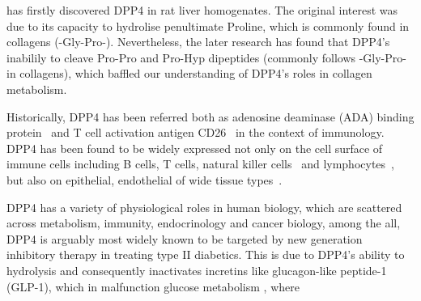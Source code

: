 \citet{Hopsu-Havu1966} has firstly discovered DPP4 in rat liver homogenates. The original interest was due to its capacity to hydrolise penultimate Proline, which is commonly found in collagens (-Gly-Pro-). Nevertheless, the later research has found that DPP4's inabilily to cleave Pro-Pro and Pro-Hyp dipeptides (commonly follows -Gly-Pro- in collagens), which baffled our understanding of DPP4's roles in collagen metabolism.
\par
Historically, DPP4 has been referred both as adenosine deaminase (ADA) binding protein~\cite{Kameoka_1993} and T cell activation antigen CD26~\cite{Fleischer_1994} in the context of immunology. DPP4 has been found to be widely expressed not only on the cell surface of immune cells including B cells, T cells, natural killer cells~\cite{Fleischer1987,Fleischer1988,Gorrell1991,Capuani2018,Bühling1994,Bühling1995} and lymphocytes~\cite{Gorvel1991}, but also on epithelial, endothelial of wide tissue types~\cite{Gorrell2001}. 
\par 
DPP4 has a variety of physiological roles in human biology, which are scattered across metabolism, immunity, endocrinology and cancer biology, among the all, DPP4 is arguably most widely known to be targeted by new generation inhibitory therapy in treating type II diabetics. This is due to DPP4's ability to hydrolysis and consequently inactivates incretins like glucagon-like peptide-1 (GLP-1), which in malfunction glucose metabolism , where 
\par 
